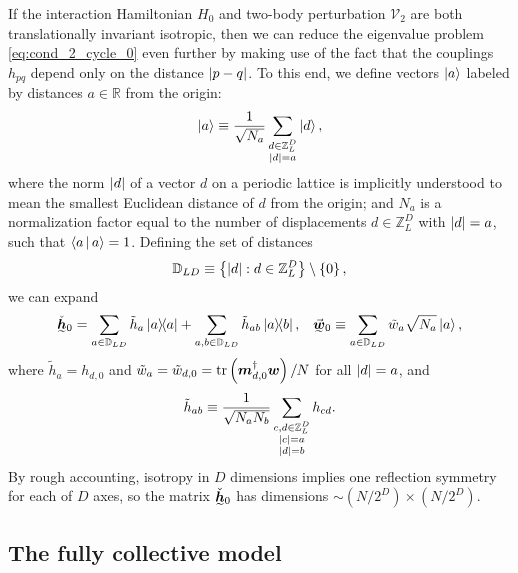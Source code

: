 \documentclass[nofootinbib,notitlepage,11pt]{revtex4-2}
\newcommand{\f}[2]{\dfrac{#1}{#2}} %
\newcommand{\p}[1]{\left(#1\right)} %
\renewcommand{\set}[1]{\left\{#1\right\}} %
\newcommand{\bk}{\Braket} %
\newcommand{\m}{\bm} %
\renewcommand{\v}{\vec} %
\newcommand{\1}{\mathds{1}}
\newcommand{\V}{\mathcal{V}}
\newcommand{\DD}{\mathbb{D}}
\newcommand{\RR}{\mathbb{R}}
\newcommand{\ZZ}{\mathbb{Z}}
\newcommand{\ut}{\undertilde}
\begin{document}
If the interaction Hamiltonian $H_0$ and two-body perturbation $\V_2$
are both translationally invariant isotropic, then we can reduce the
eigenvalue problem \eqref{eq:cond_2_cycle_0} even further by making
use of the fact that the couplings $h_{pq}$ depend only on the
distance $\abs{p-q}$.  To this end, we define vectors $\ket{a}$
labeled by distances $a\in\RR$ from the origin:
\begin{align}
  \ket{a} \equiv \f1{\sqrt{N_a}}
  \sum_{\substack{d\in\ZZ_L^D\\\abs{d}=a}} \ket{d},
\end{align}
where the norm $\abs{d}$ of a vector $d$ on a periodic lattice is
implicitly understood to mean the smallest Euclidean distance of $d$
from the origin; and $N_a$ is a normalization factor equal to the
number of displacements $d\in\ZZ_L^D$ with $\abs{d}=a$, such that
$\bk{a|a}=1$.  Defining the set of distances
\begin{align}
  \DD_{LD} \equiv \set{ \abs{d} : d \in \ZZ_L^D } \setminus \set{0},
\end{align}
we can expand
\begin{align}
  \ut{\check{\m h}}_0
  = \sum_{a\in\DD_{LD}} \tilde h_a \op{a}
  + \sum_{a,b\in\DD_{LD}} \tilde h_{ab} \op{a}{b},
  &&
  \ut{\v{\m w}}_0
  \equiv \sum_{a\in\DD_{LD}} \tilde w_a \sqrt{N_a} \ket{a},
\end{align}
where $\tilde h_a=h_{d,0}$ and
$\tilde w_a=\tilde w_{d,0}=\tr\p{\m m_{d,0}^\dag \m w}/N$ for all
$\abs{d}=a$, and
\begin{align}
  \tilde h_{ab} \equiv \f1{\sqrt{N_aN_b}}
  \sum_{\substack{c,d\in\ZZ_L^D\\\abs{c}=a\\\abs{d}=b}} h_{cd}.
\end{align}
By rough accounting, isotropy in $D$ dimensions implies one reflection
symmetry for each of $D$ axes, so the matrix $\ut{\check{\m h}}_0$ has
dimensions $\sim\p{N/2^D}\times\p{N/2^D}$.

\subsection{The fully collective model}
\end{document}
